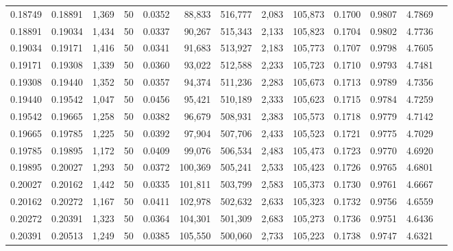 \begin{tabular}{rrrrrrrrrrrrr}
0.18749 & 0.18891 & 1,369 &  50 &                                     0.0352 &  88,833 & 516,777 &   2,083 & 105,873 & 0.1700 & 0.9807 & 4.7869 \\
0.18891 & 0.19034 & 1,434 &  50 &                                     0.0337 &  90,267 & 515,343 &   2,133 & 105,823 & 0.1704 & 0.9802 & 4.7736 \\
0.19034 & 0.19171 & 1,416 &  50 &                                     0.0341 &  91,683 & 513,927 &   2,183 & 105,773 & 0.1707 & 0.9798 & 4.7605 \\
0.19171 & 0.19308 & 1,339 &  50 &                                     0.0360 &  93,022 & 512,588 &   2,233 & 105,723 & 0.1710 & 0.9793 & 4.7481 \\
0.19308 & 0.19440 & 1,352 &  50 &                                     0.0357 &  94,374 & 511,236 &   2,283 & 105,673 & 0.1713 & 0.9789 & 4.7356 \\
0.19440 & 0.19542 & 1,047 &  50 &                                     0.0456 &  95,421 & 510,189 &   2,333 & 105,623 & 0.1715 & 0.9784 & 4.7259 \\
0.19542 & 0.19665 & 1,258 &  50 &                                     0.0382 &  96,679 & 508,931 &   2,383 & 105,573 & 0.1718 & 0.9779 & 4.7142 \\
0.19665 & 0.19785 & 1,225 &  50 &                                     0.0392 &  97,904 & 507,706 &   2,433 & 105,523 & 0.1721 & 0.9775 & 4.7029 \\
0.19785 & 0.19895 & 1,172 &  50 &                                     0.0409 &  99,076 & 506,534 &   2,483 & 105,473 & 0.1723 & 0.9770 & 4.6920 \\
0.19895 & 0.20027 & 1,293 &  50 &                                     0.0372 & 100,369 & 505,241 &   2,533 & 105,423 & 0.1726 & 0.9765 & 4.6801 \\
0.20027 & 0.20162 & 1,442 &  50 &                                     0.0335 & 101,811 & 503,799 &   2,583 & 105,373 & 0.1730 & 0.9761 & 4.6667 \\
0.20162 & 0.20272 & 1,167 &  50 &                                     0.0411 & 102,978 & 502,632 &   2,633 & 105,323 & 0.1732 & 0.9756 & 4.6559 \\
0.20272 & 0.20391 & 1,323 &  50 &                                     0.0364 & 104,301 & 501,309 &   2,683 & 105,273 & 0.1736 & 0.9751 & 4.6436 \\
0.20391 & 0.20513 & 1,249 &  50 &                                     0.0385 & 105,550 & 500,060 &   2,733 & 105,223 & 0.1738 & 0.9747 & 4.6321 \\

\end{tabular}
